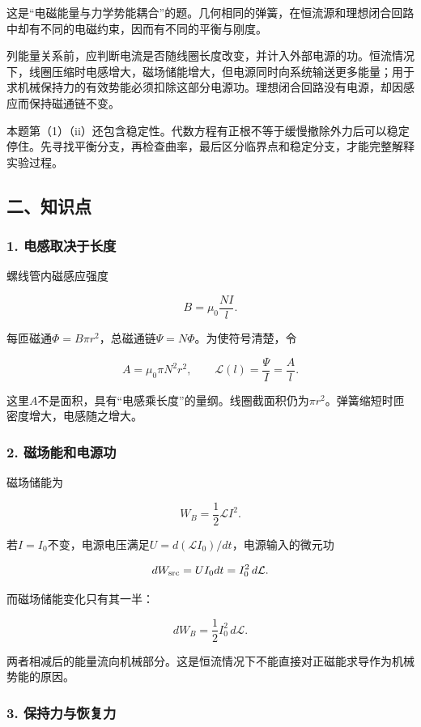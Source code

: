 \documentclass[12pt,a4paper,fontset=fandol]{ctexart}
\begin{document}
这是``电磁能量与力学势能耦合''的题。几何相同的弹簧，在恒流源和理想闭合回路中却有不同的电磁约束，因而有不同的平衡与刚度。

列能量关系前，应判断电流是否随线圈长度改变，并计入外部电源的功。恒流情况下，线圈压缩时电感增大，磁场储能增大，但电源同时向系统输送更多能量；用于求机械保持力的有效势能必须扣除这部分电源功。理想闭合回路没有电源，却因感应而保持磁通链不变。

本题第（1）（ii）还包含稳定性。代数方程有正根不等于缓慢撤除外力后可以稳定停住。先寻找平衡分支，再检查曲率，最后区分临界点和稳定分支，才能完整解释实验过程。

\subsection{二、知识点}\label{ux4e8cux77e5ux8bc6ux70b9-1}

\subsubsection{1.
电感取决于长度}\label{ux7535ux611fux53d6ux51b3ux4e8eux957fux5ea6}

螺线管内磁感应强度

\[
B=\mu_0\frac{NI}{l}.
\]

每匝磁通\(\Phi=B\pi r^2\)，总磁通链\(\Psi=N\Phi\)。为使符号清楚，令

\[
A=\mu_0\pi N^2r^2,\qquad
\mathcal L(l)=\frac{\Psi}{I}=\frac Al.
\]

这里\(A\)不是面积，具有``电感乘长度''的量纲。线圈截面积仍为\(\pi r^2\)。弹簧缩短时匝密度增大，电感随之增大。

\subsubsection{2.
磁场能和电源功}\label{ux78c1ux573aux80fdux548cux7535ux6e90ux529f}

磁场储能为

\[
W_B=\frac12\mathcal LI^2.
\]

若\(I=I_0\)不变，电源电压满足\(U=d(\mathcal LI_0)/dt\)，电源输入的微元功

\[
dW_{\rm src}=UI_0dt=I_0^2\,d\mathcal L.
\]

而磁场储能变化只有其一半：

\[
dW_B=\frac12I_0^2\,d\mathcal L.
\]

两者相减后的能量流向机械部分。这是恒流情况下不能直接对正磁能求导作为机械势能的原因。

\subsubsection{3.
保持力与恢复力}\label{ux4fddux6301ux529bux4e0eux6062ux590dux529b}
\end{document}

